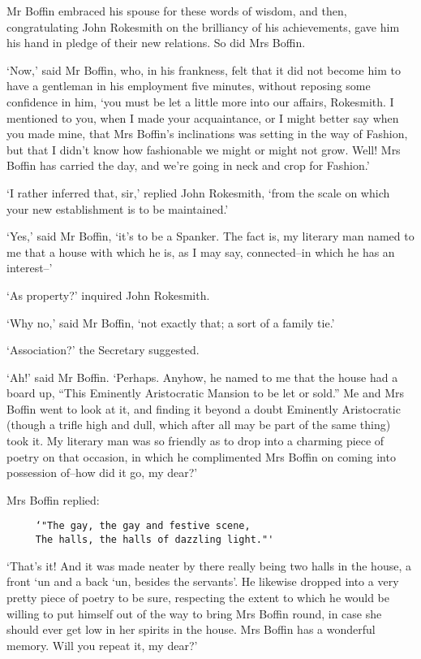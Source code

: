 Mr Boffin embraced his spouse for these words of wisdom, and then,
congratulating John Rokesmith on the brilliancy of his achievements,
gave him his hand in pledge of their new relations. So did Mrs Boffin.

‘Now,’ said Mr Boffin, who, in his frankness, felt that it did not
become him to have a gentleman in his employment five minutes, without
reposing some confidence in him, ‘you must be let a little more into our
affairs, Rokesmith. I mentioned to you, when I made your acquaintance,
or I might better say when you made mine, that Mrs Boffin’s inclinations
was setting in the way of Fashion, but that I didn’t know how
fashionable we might or might not grow. Well! Mrs Boffin has carried the
day, and we’re going in neck and crop for Fashion.’

‘I rather inferred that, sir,’ replied John Rokesmith, ‘from the scale
on which your new establishment is to be maintained.’

‘Yes,’ said Mr Boffin, ‘it’s to be a Spanker. The fact is, my
literary man named to me that a house with which he is, as I may say,
connected--in which he has an interest--’

‘As property?’ inquired John Rokesmith.

‘Why no,’ said Mr Boffin, ‘not exactly that; a sort of a family tie.’

‘Association?’ the Secretary suggested.

‘Ah!’ said Mr Boffin. ‘Perhaps. Anyhow, he named to me that the house
had a board up, “This Eminently Aristocratic Mansion to be let or sold.”
 Me and Mrs Boffin went to look at it, and finding it beyond a doubt
Eminently Aristocratic (though a trifle high and dull, which after all
may be part of the same thing) took it. My literary man was so friendly
as to drop into a charming piece of poetry on that occasion, in which he
complimented Mrs Boffin on coming into possession of--how did it go, my
dear?’

Mrs Boffin replied:

\begin{verbatim}
     ‘"The gay, the gay and festive scene,
     The halls, the halls of dazzling light."'
\end{verbatim}

‘That’s it! And it was made neater by there really being two halls
in the house, a front ‘un and a back ‘un, besides the servants’.
He likewise dropped into a very pretty piece of poetry to be sure,
respecting the extent to which he would be willing to put himself out
of the way to bring Mrs Boffin round, in case she should ever get low
in her spirits in the house. Mrs Boffin has a wonderful memory. Will you
repeat it, my dear?’

